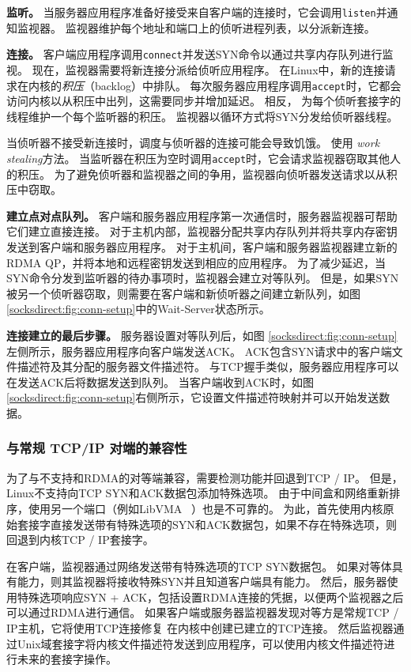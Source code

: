 \textbf{监听。}
当服务器应用程序准备好接受来自客户端的连接时，它会调用\texttt {listen}并通知监视器。
监视器维护每个地址和端口上的侦听进程列表，以分派新连接。


\textbf{连接。}
客户端应用程序调用\texttt {connect}并发送SYN命令以通过共享内存队列进行监视。
现在，监视器需要将新连接分派给侦听应用程序。
在Linux中，新的连接请求在内核的\emph {积压}（backlog）中排队。
每次服务器应用程序调用\texttt {accept}时，它都会访问内核以从积压中出列，这需要同步并增加延迟。
相反，\sys{} 为每个侦听套接字的线程维护一个每个监听器的积压。
监视器以循环方式将SYN分发给侦听器线程。

当侦听器不接受新连接时，调度与侦听器的连接可能会导致饥饿。
\sys{} 使用 \emph {work stealing}方法。
当监听器在积压为空时调用\texttt {accept}时，它会请求监视器窃取其他人的积压。
为了避免侦听器和监视器之间的争用，监视器向侦听器发送请求以从积压中窃取。

\textbf {建立点对点队列。}
客户端和服务器应用程序第一次通信时，服务器监视器可帮助它们建立直接连接。
对于主机内部，监视器分配共享内存队列并将共享内存密钥发送到客户端和服务器应用程序。
对于主机间，客户端和服务器监视器建立新的RDMA QP，并将本地和远程密钥发送到相应的应用程序。
为了减少延迟，当SYN命令分发到监听器的待办事项时，监视器会建立对等队列。
但是，如果SYN被另一个侦听器窃取，则需要在客户端和新侦听器之间建立新队列，如图 \ref {socksdirect:fig:conn-setup}中的Wait-Server状态所示。

\textbf {连接建立的最后步骤。}
服务器设置对等队列后，如图 \ref {socksdirect:fig:conn-setup}左侧所示，服务器应用程序向客户端发送ACK。 ACK包含SYN请求中的客户端文件描述符及其分配的服务器文件描述符。
与TCP握手类似，服务器应用程序可以在发送ACK后将数据发送到队列。
当客户端收到ACK时，如图 \ref {socksdirect:fig:conn-setup}右侧所示，它设置文件描述符映射并可以开始发送数据。


\subsubsection{与常规 TCP/IP 对端的兼容性}


为了与不支持\sys {}和RDMA的对等端兼容，需要检测\sys {}功能并回退到TCP / IP。
但是，Linux不支持向TCP SYN和ACK数据包添加特殊选项。
由于中间盒和网络重新排序，使用另一个端口（例如LibVMA~ \cite {libvma}）也是不可靠的。
为此，首先使用内核原始套接字直接发送带有特殊选项的SYN和ACK数据包，如果不存在特殊选项，则回退到内核TCP / IP套接字。

在客户端，监视器通过网络发送带有特殊选项的TCP SYN数据包。
如果对等体具有\sys {}能力，则其监视器将接收特殊SYN并且知道客户端具有\sys {}能力。
然后，服务器使用特殊选项响应SYN + ACK，包括设置RDMA连接的凭据，以便两个监视器之后可以通过RDMA进行通信。
如果客户端或服务器监视器发现对等方是常规TCP / IP主机，它将使用TCP连接修复 \cite {tcp-connection-repair}在内核中创建已建立的TCP连接。
然后监视器通过Unix域套接字将内核文件描述符发送到应用程序，\libipc {}可以使用内核文件描述符进行未来的套接字操作。


